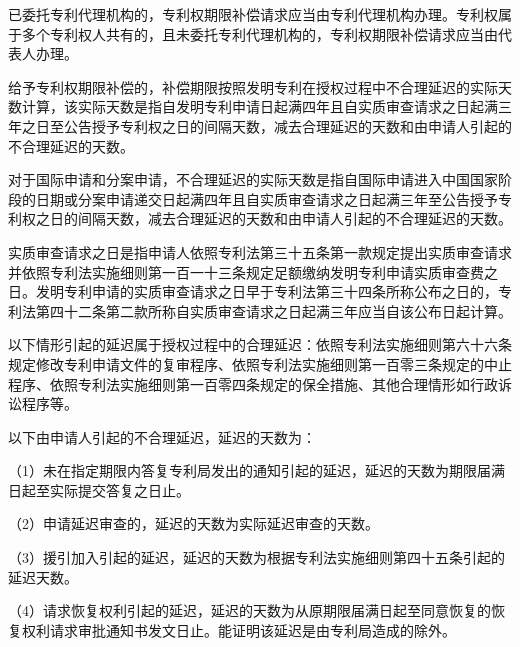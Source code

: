 已委托专利代理机构的，专利权期限补偿请求应当由专利代理机构办理。专利权属于多个专利权人共有的，且未委托专利代理机构的，专利权期限补偿请求应当由代表人办理。

给予专利权期限补偿的，补偿期限按照发明专利在授权过程中不合理延迟的实际天数计算，该实际天数是指自发明专利申请日起满四年且自实质审查请求之日起满三年之日至公告授予专利权之日的间隔天数，减去合理延迟的天数和由申请人引起的不合理延迟的天数。

对于国际申请和分案申请，不合理延迟的实际天数是指自国际申请进入中国国家阶段的日期或分案申请递交日起满四年且自实质审查请求之日起满三年至公告授予专利权之日的间隔天数，减去合理延迟的天数和由申请人引起的不合理延迟的天数。

实质审查请求之日是指申请人依照专利法第三十五条第一款规定提出实质审查请求并依照专利法实施细则第一百一十三条规定足额缴纳发明专利申请实质审查费之日。发明专利申请的实质审查请求之日早于专利法第三十四条所称公布之日的，专利法第四十二条第二款所称自实质审查请求之日起满三年应当自该公布日起计算。

以下情形引起的延迟属于授权过程中的合理延迟：依照专利法实施细则第六十六条规定修改专利申请文件的复审程序、依照专利法实施细则第一百零三条规定的中止程序、依照专利法实施细则第一百零四条规定的保全措施、其他合理情形如行政诉讼程序等。

以下由申请人引起的不合理延迟，延迟的天数为：

{\setlength{\parindent}{17.1bp}（1）未在指定期限内答复专利局发出的通知引起的延迟，延迟的天数为期限届满日起至实际提交答复之日止。\par}

{\setlength{\parindent}{17.1bp}（2）申请延迟审查的，延迟的天数为实际延迟审查的天数。\par}

{\setlength{\parindent}{17.1bp}（3）援引加入引起的延迟，延迟的天数为根据专利法实施细则第四十五条引起的延迟天数。\par}

{\setlength{\parindent}{17.1bp}（4）请求恢复权利引起的延迟，延迟的天数为从原期限届满日起至同意恢复的恢复权利请求审批通知书发文日止。能证明该延迟是由专利局造成的除外。\par}

